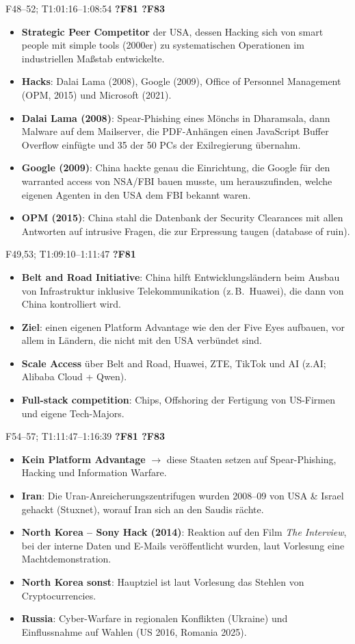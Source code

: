 \documentclass[10pt,a4paper]{article}
\newcommand{\block}[2]{\par\vspace{3pt}{\bfseries #1}\hfill{\scriptsize #2}\par\nopagebreak}
\begin{document}
\block{China: Hacks}{F48--52; T1:01:16--1:08:54 \quad \textbf{?F81 ?F83}}
\begin{itemize}
\item \textbf{Strategic Peer Competitor} der USA, dessen Hacking sich von smart people mit simple tools (2000er) zu systematischen Operationen im industriellen Maßstab entwickelte.
\item \textbf{Hacks}: Dalai Lama (2008), Google (2009), Office of Personnel Management (OPM, 2015) und Microsoft (2021).
\item \textbf{Dalai Lama (2008)}: Spear-Phishing eines Mönchs in Dharamsala, dann Malware auf dem Mailserver, die PDF-Anhängen einen JavaScript Buffer Overflow einfügte und 35 der 50 PCs der Exilregierung übernahm.
\item \textbf{Google (2009)}: China hackte genau die Einrichtung, die Google für den warranted access von NSA/FBI bauen musste, um herauszufinden, welche eigenen Agenten in den USA dem FBI bekannt waren.
\item \textbf{OPM (2015)}: China stahl die Datenbank der Security Clearances mit allen Antworten auf intrusive Fragen, die zur Erpressung taugen (\glqq database of ruin\grqq).
\end{itemize}
\block{China: Belt and Road und Platform Advantage}{F49,53; T1:09:10--1:11:47 \quad \textbf{?F81}}
\begin{itemize}
\item \textbf{Belt and Road Initiative}: China hilft Entwicklungsländern beim Ausbau von Infrastruktur inklusive Telekommunikation (z.\,B.\ Huawei), die dann von China kontrolliert wird.
\item \textbf{Ziel}: einen eigenen Platform Advantage wie den der Five Eyes aufbauen, vor allem in Ländern, die nicht mit den USA verbündet sind.
\item \textbf{Scale Access} über Belt and Road, Huawei, ZTE, TikTok und AI (z.AI; Alibaba Cloud + Qwen).
\item \textbf{Full-stack competition}: Chips, Offshoring der Fertigung von US-Firmen und eigene Tech-Majors.
\end{itemize}
\block{Russia, Iran, North Korea}{F54--57; T1:11:47--1:16:39 \quad \textbf{?F81 ?F83}}
\begin{itemize}
\item \textbf{Kein Platform Advantage} $\rightarrow$ diese Staaten setzen auf Spear-Phishing, Hacking und Information Warfare.
\item \textbf{Iran}: Die Uran-Anreicherungszentrifugen wurden 2008--09 von USA \& Israel gehackt (Stuxnet), worauf Iran sich an den Saudis rächte.
\item \textbf{North Korea -- Sony Hack (2014)}: Reaktion auf den Film \emph{The Interview}, bei der interne Daten und E-Mails veröffentlicht wurden, laut Vorlesung eine Machtdemonstration.
\item \textbf{North Korea sonst}: Hauptziel ist laut Vorlesung das Stehlen von Cryptocurrencies.
\item \textbf{Russia}: Cyber-Warfare in regionalen Konflikten (Ukraine) und Einflussnahme auf Wahlen (US 2016, Romania 2025).
\end{itemize}
\end{document}
